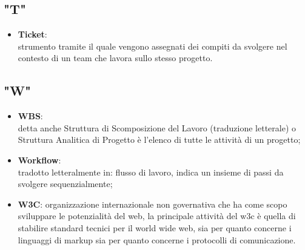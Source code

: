 \subsection{"T"}
\begin{itemize}
\item \textbf{Ticket}:\\ strumento tramite il quale vengono assegnati dei compiti da svolgere nel contesto di un team che lavora sullo stesso progetto.
\end{itemize}

\subsection{"W"}
\begin{itemize}
\item \textbf{WBS}:\\ detta anche Struttura di Scomposizione del Lavoro (traduzione letterale) o Struttura Analitica di Progetto è l'elenco di tutte le attività di un progetto;
\item \textbf{Workflow}:\\ tradotto letteralmente in: flusso di lavoro, indica un insieme di passi da svolgere sequenzialmente;
\item \textbf{W3C}: organizzazione internazionale non governativa che ha come scopo sviluppare le potenzialità del web, la principale attività del w3c è quella di stabilire standard tecnici per il world wide web, sia per quanto concerne i linguaggi di markup sia per quanto concerne i protocolli di comunicazione.
\end{itemize}

